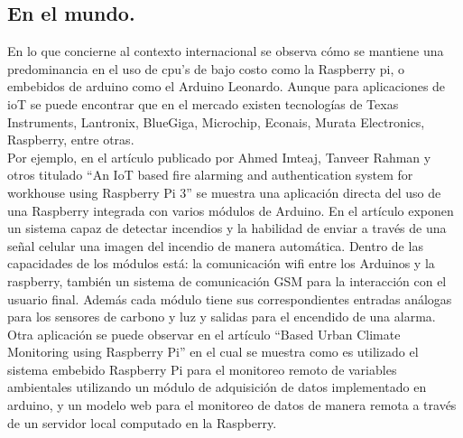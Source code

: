 \subsection{En el mundo.}
En lo que concierne al contexto internacional se observa cómo se mantiene una predominancia en el uso de cpu’s de bajo costo como la Raspberry pi, o embebidos de arduino como el Arduino Leonardo. Aunque para aplicaciones de ioT se puede encontrar  que en el mercado existen tecnologías de Texas Instruments, Lantronix, BlueGiga, Microchip, Econais, Murata Electronics, Raspberry, entre otras.
\vspace{0.5cm}\\
Por ejemplo, en el artículo publicado por Ahmed Imteaj, Tanveer Rahman y otros titulado “An IoT based fire alarming and authentication system for workhouse using Raspberry Pi 3” \cite{Imteaj2017} se muestra una aplicación directa del uso de una Raspberry integrada con varios módulos de Arduino. En el artículo exponen un sistema capaz de detectar incendios y la habilidad de enviar a través de una señal celular una imagen del incendio de manera automática. Dentro de las capacidades de los módulos está: la comunicación wifi entre los Arduinos y la raspberry, también un sistema de comunicación GSM para la interacción con el usuario final. Además cada módulo tiene sus correspondientes entradas análogas para los sensores de carbono y luz y salidas para el encendido de una alarma.
\vspace{0.5cm}\\
Otra aplicación se puede observar en el artículo “Based Urban Climate Monitoring using Raspberry Pi” \cite{Shete2016} en el cual se muestra como es utilizado el sistema embebido Raspberry Pi para el monitoreo remoto de variables ambientales utilizando un módulo de adquisición de datos implementado en arduino, y un modelo web para el monitoreo de datos de manera remota a través de un servidor local computado en la Raspberry.
\vspace{0.5cm}\\


